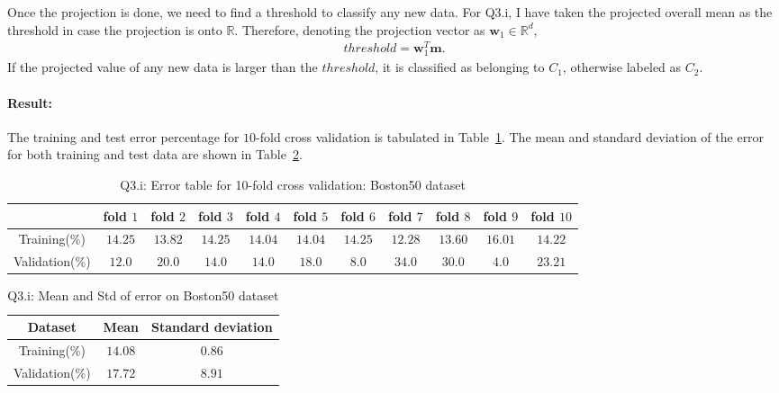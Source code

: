 Once the projection is done, we need to find a threshold to classify any new data. For Q3.i, I have taken the projected overall mean as the threshold in case the projection is onto $\mathbb{R}$. Therefore, denoting the projection vector as $\boldsymbol{w}_1 \in \mathbb{R}^d$,
\begin{align*}
	threshold = \boldsymbol{w}_1^T \boldsymbol{m}.
\end{align*}
If the projected value of any new data is larger than the $threshold$, it is classified as belonging to $C_1$, otherwise labeled as $C_2$.
\paragraph{Result:} The training and test error percentage for $10$-fold cross validation is tabulated in Table~\ref{tbl:3_i_folds}. The mean and standard deviation of the error for both training and test data are shown in Table~\ref{tbl:3_i_mean_std}.
\begin{table}[ht]
	\centering
	\caption{Q3.i: Error table for 10-fold cross validation: Boston50 dataset}
	\begin{tabular}[t]{ccccccccccc} 
		\hline
		  & fold $1$ & fold $2$ & fold $3$ & fold $4$ & fold $5$ & fold $6$ & fold $7$ & fold $8$ & fold $9$ & fold $10$\\ [0.5ex] 
		\hline
		Training(\%) & $14.25$ & $13.82$ & $14.25$ & $14.04$ & $14.04$ & $14.25$ & $12.28$ & $13.60$ & $16.01$ & $14.22$\\
		Validation(\%) & $12.0$ & $20.0$ & $14.0$ & $14.0$ & $18.0$ & $8.0$ & $34.0$ & $30.0$ & $4.0$ & $23.21$\\[1ex]
		\hline
	\end{tabular}
	\label{tbl:3_i_folds}
\end{table}
\begin{table}[ht]
	\centering
	\caption{Q3.i: Mean and Std of error on Boston50 dataset}
	\begin{tabular}[t]{ccc} 
		\hline
		Dataset & Mean & Standard deviation\\ [0.5ex] 
		\hline
		Training(\%) & $14.08$ & $0.86$\\
		Validation(\%) & $17.72$ & $8.91$\\[1ex]
		\hline
	\end{tabular}
	\label{tbl:3_i_mean_std}
\end{table}
